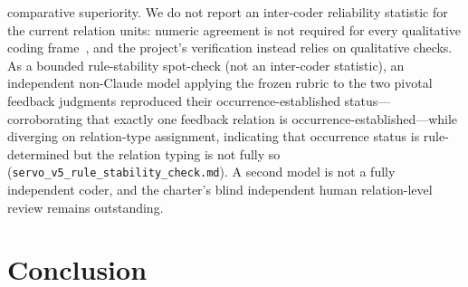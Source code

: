 \documentclass{article}
\begin{document}
comparative superiority. We do not report an inter-coder reliability statistic for the current relation units: numeric agreement is not required for every qualitative coding frame~\citep{oconnor2020icr}, and the project's verification instead relies on qualitative checks. As a bounded rule-stability spot-check (not an inter-coder statistic), an independent non-Claude model applying the frozen rubric to the two pivotal feedback judgments reproduced their occurrence-established status---corroborating that exactly one feedback relation is occurrence-established---while diverging on relation-type assignment, indicating that occurrence status is rule-determined but the relation typing is not fully so (\texttt{servo\_v5\_rule\_stability\_check.md}). A second model is not a fully independent coder, and the charter's blind independent human relation-level review remains outstanding.

\section{Conclusion}
\label{sec:conclusion}
\end{document}

